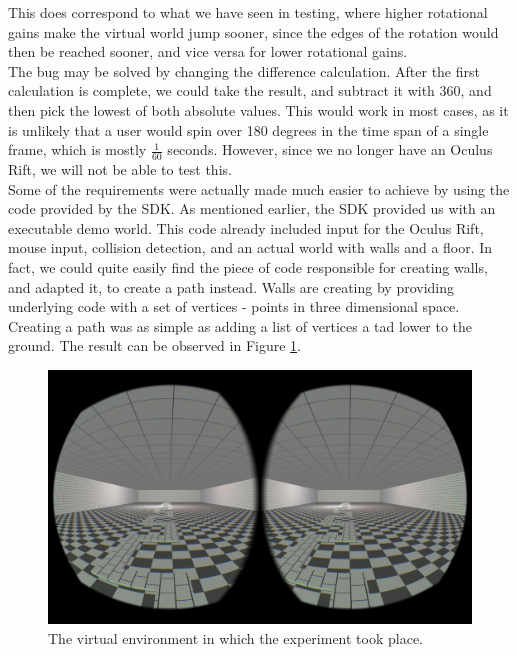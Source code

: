 This does correspond to what we have seen in testing, where higher rotational gains make the virtual world jump sooner, since the edges of the rotation would then be reached sooner, and vice versa for lower rotational gains. \\
The bug may be solved by changing the difference calculation.
After the first calculation is complete, we could take the result, and subtract it with 360, and then pick the lowest of both absolute values.
This would work in most cases, as it is unlikely that a user would spin over 180 degrees in the time span of a single frame, which is mostly $\frac{1}{60}$ seconds.
However, since we no longer have an Oculus Rift, we will not be able to test this. \\

Some of the requirements were actually made much easier to achieve by using the code provided by the SDK.
As mentioned earlier, the SDK provided us with an executable demo world.
This code already included input for the Oculus Rift, mouse input, collision detection, and an actual world with walls and a floor.
In fact, we could quite easily find the piece of code responsible for creating walls, and adapted it, to create a path instead.
Walls are creating by providing underlying code with a set of vertices - points in three dimensional space.
Creating a path was as simple as adding a list of vertices a tad lower to the ground.
The result can be observed in Figure \ref{fig:tinyroom}.

\begin{figure}
	\centering
	\includegraphics[width=\linewidth]{sections/finalreport/images/tinyroom.png}	
	\caption{The virtual environment in which the experiment took place.}
	\label{fig:tinyroom}
\end{figure}

